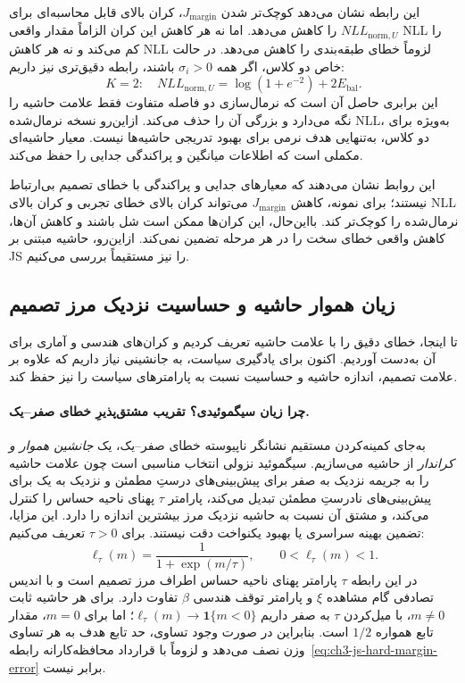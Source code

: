 این رابطه نشان می‌دهد کوچک‌تر شدن $J_{\mathrm{margin}}$، کران بالای قابل محاسبه‌ای برای $NLL_{\mathrm{norm},U}$ را کاهش می‌دهد. اما نه هر کاهش این کران الزاماً مقدار واقعی NLL را کم می‌کند و نه هر کاهش NLL لزوماً خطای طبقه‌بندی را کاهش می‌دهد. در حالت خاص دو کلاس، اگر همه $\sigma_i>0$ باشند، رابطه دقیق‌تری نیز داریم:
\begin{equation}\label{eq:ch3-normalized-NLL-binary}
\boxed{
K=2:\quad
NLL_{\mathrm{norm},U}
=\log(1+e^{-2})+2E_{\mathrm{bal}}.
}
\end{equation}
این برابری حاصل آن است که نرمال‌سازی دو فاصله متفاوت فقط علامت حاشیه را نگه می‌دارد و بزرگی آن را حذف می‌کند. ازاین‌رو نسخه نرمال‌شده NLL، به‌ویژه برای دو کلاس، به‌تنهایی هدف نرمی برای بهبود تدریجی حاشیه‌ها نیست. معیار حاشیه‌ای مکملی است که اطلاعات میانگین و پراکندگی جدایی را حفظ می‌کند.

این روابط نشان می‌دهند که معیارهای جدایی و پراکندگی
با خطای تصمیم بی‌ارتباط نیستند؛ برای نمونه،
کاهش $J_{\mathrm{margin}}$ می‌تواند کران بالای
خطای تجربی و کران بالای NLL نرمال‌شده را
کوچک‌تر کند. بااین‌حال، این کران‌ها ممکن است
شل باشند و کاهش آن‌ها، کاهش واقعی خطای سخت را
در هر مرحله تضمین نمی‌کند. ازاین‌رو،
حاشیه مبتنی بر JS را نیز مستقیماً بررسی می‌کنیم.


\subsection{زیان هموار حاشیه و حساسیت نزدیک مرز تصمیم}
\label{subsec:ch3-sigmoid-balanced-error}
تا اینجا، خطای دقیق را با
علامت حاشیه تعریف کردیم
و کران‌های هندسی و آماری
برای آن به‌دست آوردیم. اکنون
برای یادگیری سیاست، به
جانشینی نیاز داریم که
علاوه بر علامت تصمیم،
اندازه حاشیه و حساسیت
نسبت به پارامترهای سیاست
را نیز حفظ کند.

\paragraph{چرا زیان سیگموئیدی؟ تقریب مشتق‌پذیرِ خطای صفر--یک.}
به‌جای کمینه‌کردن مستقیم نشانگر ناپیوسته خطای صفر--یک،
یک \emph{جانشین هموار و کراندار} از حاشیه می‌سازیم.
سیگموئید نزولی انتخاب مناسبی است چون
علامت حاشیه را به جریمه نزدیک به صفر برای
پیش‌بینی‌های درستِ مطمئن و نزدیک به یک برای
پیش‌بینی‌های نادرستِ مطمئن تبدیل می‌کند،
پارامتر $\tau$ پهنای ناحیه حساس را کنترل می‌کند،
و مشتق آن نسبت به حاشیه نزدیک مرز بیشترین اندازه را دارد.
این مزایا، تضمین بهینه سراسری یا بهبود یکنواخت دقت نیستند.
برای $\tau>0$ تعریف می‌کنیم:
\begin{equation}\label{eq:ch3-js-sigmoid-loss}
\boxed{
\ell_\tau(m)=\frac{1}{1+\exp(m/\tau)},
\qquad 0<\ell_\tau(m)<1.
}
\end{equation}
در این رابطه $\tau$ پارامتر پهنای ناحیه حساس اطراف مرز تصمیم است و با اندیس تصادفی گام مشاهده $\xi$ و پارامتر توقف هندسی $\beta$ تفاوت دارد. برای هر حاشیه ثابت $m\ne0$، با میل‌کردن $\tau$ به صفر داریم
$\ell_\tau(m)\to\mathbf1\{m<0\}$؛ اما برای $m=0$، مقدار تابع همواره $1/2$ است. بنابراین در صورت وجود تساوی، حد تابع هدف به هر تساوی وزن نصف می‌دهد و لزوماً با قرارداد محافظه‌کارانه رابطه~\eqref{eq:ch3-js-hard-margin-error} برابر نیست.

